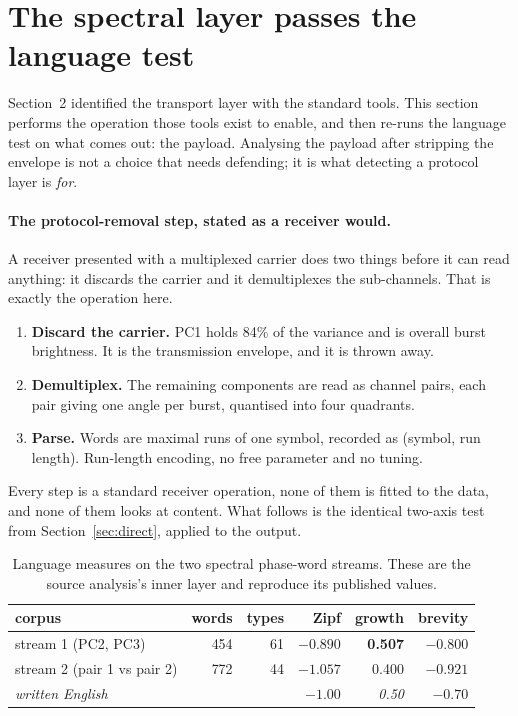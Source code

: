 \documentclass[11pt,a4paper]{article}
\newcommand{\bnum}[1]{\textbf{#1}}
\begin{document}
\section{The spectral layer passes the language test}
\label{sec:payload}

Section~2 identified the transport layer with the standard tools. This section performs
the operation those tools exist to enable, and then re-runs the language test on what
comes out: the payload. Analysing the payload after stripping the envelope is not a
choice that needs defending; it is what detecting a protocol layer is \emph{for}.

\paragraph{The protocol-removal step, stated as a receiver would.} A receiver presented
with a multiplexed carrier does two things before it can read anything: it discards the
carrier and it demultiplexes the sub-channels. That is exactly the operation here.

\begin{enumerate}[leftmargin=1.6em,itemsep=1pt]
\item \textbf{Discard the carrier.} PC1 holds 84\% of the variance and is overall burst
brightness. It is the transmission envelope, and it is thrown away.
\item \textbf{Demultiplex.} The remaining components are read as channel pairs, each
pair giving one angle per burst, quantised into four quadrants.
\item \textbf{Parse.} Words are maximal runs of one symbol, recorded as (symbol, run
length). Run-length encoding, no free parameter and no tuning.
\end{enumerate}

Every step is a standard receiver operation, none of them is fitted to the data, and
none of them looks at content. What follows is the identical two-axis test from
Section~\ref{sec:direct}, applied to the output.

\begin{table}[htbp]
\centering
\caption{Language measures on the two spectral phase-word streams. These are the
source analysis's inner layer \cite{meucci2026} and reproduce its published values.}
\label{tab:payload}
\begin{tabular}{lrrrrr}
\toprule
corpus & words & types & \bnum{Zipf} & \bnum{growth} & \bnum{brevity} \\
\midrule
stream 1 (PC2, PC3) & 454 & 61 & $-0.890$ & \bnum{0.507} & $-0.800$ \\
stream 2 (pair 1 vs pair 2) & 772 & 44 & $\mathbf{-1.057}$ & 0.400 & $\mathbf{-0.921}$ \\
\emph{written English} & & & \emph{$-1.00$} & \emph{0.50} & \emph{$-0.70$} \\
\bottomrule
\end{tabular}
\end{table}
\end{document}
